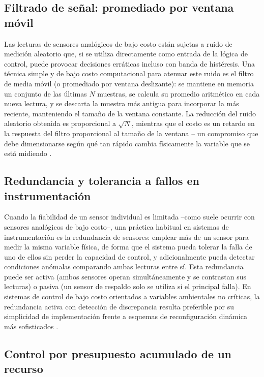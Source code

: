 \subsection{Filtrado de señal: promediado por ventana móvil}

Las lecturas de sensores analógicos de bajo costo están sujetas a ruido de medición aleatorio que, si se utiliza directamente como entrada de la lógica de control, puede provocar decisiones erráticas incluso con banda de histéresis. Una técnica simple y de bajo costo computacional para atenuar este ruido es el filtro de media móvil (o promediado por ventana deslizante): se mantiene en memoria un conjunto de las últimas $N$ muestras, se calcula su promedio aritmético en cada nueva lectura, y se descarta la muestra más antigua para incorporar la más reciente, manteniendo el tamaño de la ventana constante. La reducción del ruido aleatorio obtenida es proporcional a $\sqrt{N}$, mientras que el costo es un retardo en la respuesta del filtro proporcional al tamaño de la ventana -- un compromiso que debe dimensionarse según qué tan rápido cambia físicamente la variable que se está midiendo \cite{smith1997dsp}.

\subsection{Redundancia y tolerancia a fallos en instrumentación}
\label{subsec:redundancia}

Cuando la fiabilidad de un sensor individual es limitada --como suele ocurrir con sensores analógicos de bajo costo--, una práctica habitual en sistemas de instrumentación es la redundancia de sensores: emplear más de un sensor para medir la misma variable física, de forma que el sistema pueda tolerar la falla de uno de ellos sin perder la capacidad de control, y adicionalmente pueda detectar condiciones anómalas comparando ambas lecturas entre sí. Esta redundancia puede ser activa (ambos sensores operan simultáneamente y se contrastan sus lecturas) o pasiva (un sensor de respaldo solo se utiliza si el principal falla). En sistemas de control de bajo costo orientados a variables ambientales no críticas, la redundancia activa con detección de discrepancia resulta preferible por su simplicidad de implementación frente a esquemas de reconfiguración dinámica más sofisticados \cite{redundancia_riunet, redundancia_mfgrobots}.

\subsection{Control por presupuesto acumulado de un recurso}
\label{subsec:control_presupuesto}

